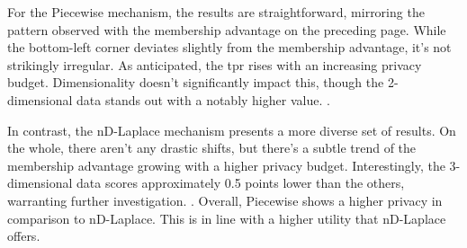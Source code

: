 For the Piecewise mechanism, the results are straightforward, mirroring the pattern observed with the membership advantage on the preceding page. While the bottom-left corner deviates slightly from the membership advantage, it's not strikingly irregular. As anticipated, the \gls{tpr} rises with an increasing privacy budget. Dimensionality doesn't significantly impact this, though the 2-dimensional data stands out with a notably higher value. .

In contrast, the nD-Laplace mechanism presents a more diverse set of results. On the whole, there aren't any drastic shifts, but there's a subtle trend of the membership advantage growing with a higher privacy budget. Interestingly, the 3-dimensional data scores approximately 0.5 points lower than the others, warranting further investigation. .
Overall, Piecewise shows a higher privacy in comparison to nD-Laplace. This is in line with a higher utility that nD-Laplace offers.
\newpage

